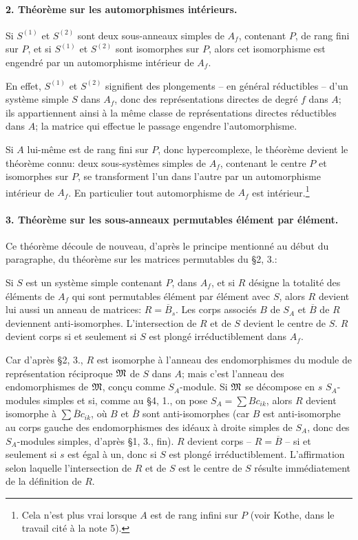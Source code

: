 \paragraph{2. Théorème sur les automorphismes intérieurs.}
Si \(S^{(1)}\) et \(S^{(2)}\) sont deux sous-anneaux simples de \(A_f\), contenant \(P\), de rang fini sur \(P\), et si \(S^{(1)}\) et \(S^{(2)}\) sont isomorphes sur \(P\), alors cet isomorphisme est engendré par un automorphisme intérieur de \(A_f\).

En effet, \(S^{(1)}\) et \(S^{(2)}\) signifient des plongements -- en général réductibles -- d'un système simple \(S\) dans \(A_f\), donc des représentations directes de degré \(f\) dans \(A\); ils appartiennent ainsi à la même classe de représentations directes réductibles dans \(A\); la matrice qui effectue le passage engendre l'automorphisme.

Si \(A\) lui-même est de rang fini sur \(P\), donc hypercomplexe, le théorème devient le théorème connu: deux sous-systèmes simples de \(A_f\), contenant le centre \(P\) et isomorphes sur \(P\), se transforment l'un dans l'autre par un automorphisme intérieur de \(A_f\). En particulier tout automorphisme de \(A_f\) est intérieur.\footnote{Cela n'est plus vrai lorsque \(A\) est de rang infini sur \(P\) (voir Kothe, dans le travail cité à la note 5).}

\paragraph{3. Théorème sur les sous-anneaux permutables élément par élément.}
Ce théorème découle de nouveau, d'après le principe mentionné au début du paragraphe, du théorème sur les matrices permutables du \S 2, 3.:

Si \(S\) est un système simple contenant \(P\), dans \(A_f\), et si \(R\) désigne la totalité des éléments de \(A_f\) qui sont permutables élément par élément avec \(S\), alors \(R\) devient lui aussi un anneau de matrices: \(R=\overline B_s\). Les corps associés \(B\) de \(S_A\) et \(\overline B\) de \(R\) deviennent anti-isomorphes. L'intersection de \(R\) et de \(S\) devient le centre de \(S\). \(R\) devient corps si et seulement si \(S\) est plongé irréductiblement dans \(A_f\).

Car d'après \S 2, 3., \(R\) est isomorphe à l'anneau des endomorphismes du module de représentation réciproque \(\mathfrak M\) de \(S\) dans \(A\); mais c'est l'anneau des endomorphismes de \(\mathfrak M\), conçu comme \(S_A\)-module. Si \(\mathfrak M\) se décompose en \(s\) \(S_A\)-modules simples et si, comme au \S 4, 1., on pose \(S_A=\sum Bc_{ik}\), alors \(R\) devient isomorphe à \(\sum \overline Bc_{ik}\), où \(B\) et \(\overline B\) sont anti-isomorphes (car \(B\) est anti-isomorphe au corps gauche des endomorphismes des idéaux à droite simples de \(S_A\), donc des \(S_A\)-modules simples, d'après \S 1, 3., fin). \(R\) devient corps -- \(R=\overline B\) -- si et seulement si \(s\) est égal à un, donc si \(S\) est plongé irréductiblement. L'affirmation selon laquelle l'intersection de \(R\) et de \(S\) est le centre de \(S\) résulte immédiatement de la définition de \(R\).

